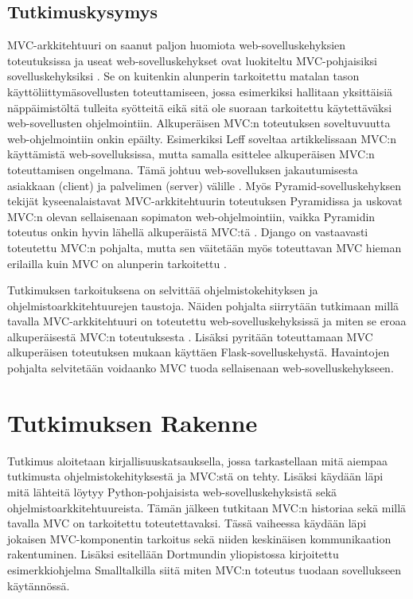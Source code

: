 \documentclass[utf8]{gradu3}
\begin{document}
\section{Tutkimuskysymys}
MVC-arkkitehtuuri on saanut paljon huomiota web-sovelluskehyksien
toteutuksissa ja useat web-sovelluskehykset ovat luokiteltu
MVC-pohjaisiksi sovelluskehyksiksi \parencite{mvcframeworks}. Se on kuitenkin alunperin
tarkoitettu matalan tason käyttöliittymäsovellusten toteuttamiseen,
jossa esimerkiksi hallitaan yksittäisiä näppäimistöltä tulleita
syötteitä eikä sitä ole suoraan tarkoitettu käytettäväksi
web-sovellusten ohjelmointiin. Alkuperäisen MVC:n toteutuksen
soveltuvuutta web-ohjelmointiin onkin epäilty. Esimerkiksi Leff
soveltaa artikkelissaan MVC:n käyttämistä web-sovelluksissa, mutta
samalla esittelee alkuperäisen MVC:n toteuttamisen ongelmana. Tämä johtuu web-sovelluksen jakautumisesta asiakkaan
(client) ja palvelimen (server) välille \parencite{ibm_watson}. Myös Pyramid-sovelluskehyksen tekijät
kyseenalaistavat MVC-arkkitehtuurin toteutuksen Pyramidissa ja uskovat
MVC:n olevan sellaisenaan sopimaton web-ohjelmointiin, vaikka
Pyramidin toteutus onkin hyvin lähellä alkuperäistä MVC:tä
\parencite{pyramid}. Django on vastaavasti toteutettu MVC:n pohjalta, mutta sen väitetään myös toteuttavan MVC hieman erilailla kuin MVC on alunperin tarkoitettu \parencite{django_mvc}.

Tutkimuksen tarkoituksena on selvittää ohjelmistokehityksen ja ohjelmistoarkkitehtuurejen taustoja. Näiden pohjalta siirrytään tutkimaan millä tavalla 
MVC-arkkitehtuuri on toteutettu web-sovelluskehyksissä ja miten se
eroaa alkuperäisestä MVC:n toteutuksesta \parencite{krasner}. Lisäksi pyritään toteuttamaan MVC alkuperäisen
toteutuksen mukaan käyttäen Flask-sovelluskehystä. Havaintojen pohjalta
selvitetään voidaanko MVC tuoda sellaisenaan web-sovelluskehykseen.

\chapter{Tutkimuksen Rakenne}
Tutkimus aloitetaan kirjallisuuskatsauksella, jossa tarkastellaan mitä aiempaa 
tutkimusta ohjelmistokehityksestä ja MVC:stä on tehty. Lisäksi käydään
läpi mitä lähteitä löytyy Python-pohjaisista web-sovelluskehyksistä sekä ohjelmistoarkkitehtuureista. Tämän jälkeen 
tutkitaan MVC:n historiaa sekä millä tavalla MVC on tarkoitettu toteutettavaksi.
Tässä vaiheessa käydään läpi jokaisen MVC-komponentin tarkoitus sekä niiden 
keskinäisen kommunikaation rakentuminen. Lisäksi esitellään
Dortmundin yliopistossa kirjoitettu esimerkkiohjelma Smalltalkilla siitä miten MVC:n 
toteutus tuodaan sovellukseen käytännössä.
\end{document}
